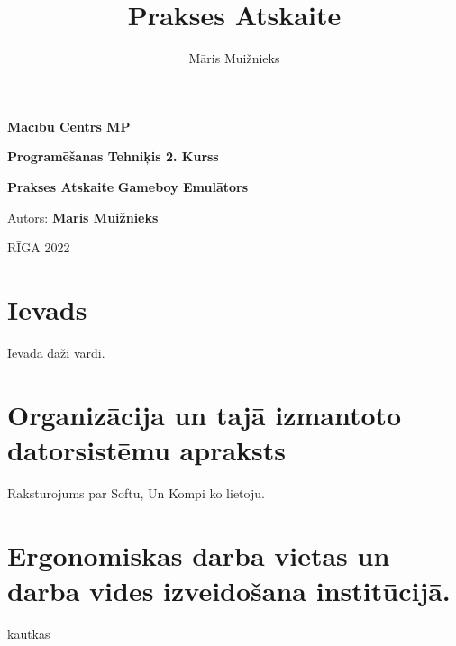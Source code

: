 \documentclass[12pt]{article}
\title{Prakses Atskaite}
\author{Māris Muižnieks}
\begin{document}
	\begin{titlepage}
		\thispagestyle{empty}
		\begin{center}
			\vspace*{2cm}
			\begin{large}\textbf{Mācību Centrs MP}
				
				\textbf{Programēšanas Tehniķis 2. Kurss}
				
				\vfill
				\textbf{Prakses Atskaite}
				\textbf{Gameboy Emulātors}
			\end{large}
			
			\vfill
			
		\end{center}
		\vspace{4cm}
		\begin{flushright}
			Autors: \textbf{Māris Muižnieks}
			
		\end{flushright}
		\vspace{1cm}
		\begin{center}
			RĪGA 2022
		\end{center}
	\end{titlepage}
	\tableofcontents
	\pagebreak
	
	\section{Ievads}
	Ievada daži vārdi.
	\pagebreak
	
	\section{Organizācija un tajā izmantoto datorsistēmu apraksts}
	Raksturojums par Softu, Un Kompi ko lietoju.
	\pagebreak
	
	\section{Ergonomiskas darba vietas un darba vides izveidošana institūcijā.}
	kautkas
	\pagebreak
\end{document}
